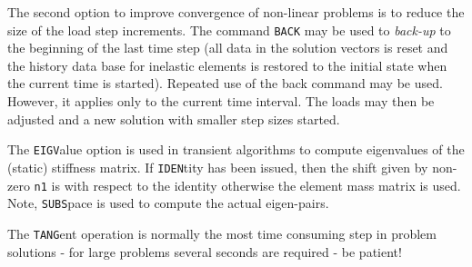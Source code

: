 The second option to improve convergence of non-linear
problems is to reduce the size of the load step increments.
The command {\tt BACK} may be used to {\it back-up} to the
beginning of the last time step (all data in the solution
vectors is reset and the history data base for inelastic
elements is restored to the initial state when the current
time is started). Repeated use of the back command may be
used. However, it applies only to the current time interval.
The loads may then be adjusted and a new solution with
smaller step sizes started.

The {\tt EIGV}alue option is used in transient algorithms to
compute eigenvalues of the (static) stiffness matrix.  If
{\tt IDEN}tity has been issued, then the shift given by non-zero
{\tt n1} is with respect to the identity otherwise the element
mass matrix is used.  Note, {\tt SUBS}pace is used to compute the
actual eigen-pairs.

The {\tt TANG}ent operation is normally the most time consuming
step in problem solutions - for large problems several
seconds are required - be patient!
\vfill\eject
